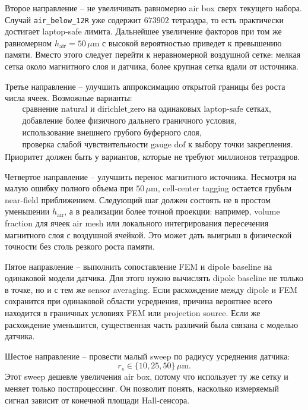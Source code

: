 \documentclass[12pt,a4paper]{article}
\begin{document}
Второе направление -- не увеличивать равномерно air box сверх текущего набора.
Случай \texttt{air\_below\_12R} уже содержит \(673902\) тетраэдра, то есть
практически достигает laptop-safe лимита. Дальнейшее увеличение факторов при
том же равномерном \(h_{\mathrm{air}}=50\,\mu\mathrm{m}\) с высокой вероятностью
приведет к превышению памяти. Вместо этого следует перейти к неравномерной
воздушной сетке: мелкая сетка около магнитного слоя и датчика, более крупная
сетка вдали от источника.

Третье направление -- улучшить аппроксимацию открытой границы без роста числа
ячеек. Возможные варианты:
\[
\begin{aligned}
&\text{сравнение natural и dirichlet\_zero на одинаковых laptop-safe сетках},\\
&\text{добавление более физичного дальнего граничного условия},\\
&\text{использование внешнего грубого буферного слоя},\\
&\text{проверка слабой чувствительности gauge dof к выбору точки закрепления}.
\end{aligned}
\]
Приоритет должен быть у вариантов, которые не требуют миллионов тетраэдров.

Четвертое направление -- улучшить перенос магнитного источника. Несмотря на
малую ошибку полного объема при \(50\,\mu\mathrm{m}\), cell-center tagging
остается грубым near-field приближением. Следующий шаг должен состоять не в
простом уменьшении \(h_{\mathrm{air}}\), а в реализации более точной проекции:
например, volume fraction для ячеек air mesh или локального интегрирования
пересечения магнитного слоя с воздушной ячейкой. Это может дать выигрыш в
физической точности без столь резкого роста памяти.

Пятое направление -- выполнить сопоставление FEM и dipole baseline на одинаковой
модели датчика. Для этого нужно вычислять dipole baseline не только в точке, но
и с тем же sensor averaging. Если расхождение между dipole и FEM сохранится при
одинаковой области усреднения, причина вероятнее всего находится в граничных
условиях FEM или projection source. Если же расхождение уменьшится, существенная
часть различий была связана с моделью датчика.

Шестое направление -- провести малый sweep по радиусу усреднения датчика:
\[
    r_s \in \{10,25,50\}\,\mu\mathrm{m}.
\]
Этот sweep дешевле увеличения air box, потому что использует ту же сетку и
меняет только постпроцессинг. Он позволит понять, насколько измеряемый сигнал
зависит от конечной площади Hall-сенсора.
\end{document}
